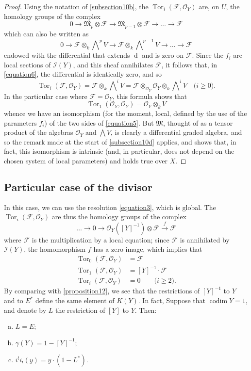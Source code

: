 \documentclass{article}
\theoremstyle{plain}
\newenvironment{proposition}[1]
    {\renewcommand\theinnercustomproposition{#1}\innercustomproposition}
    {\endinnercustomproposition}
\theoremstyle{definition}
\newcommand{\sh}{\mathscr}
\newcommand{\dd}{\operatorname{d}\!}
\renewcommand{\geq}{\geqslant}
\DeclareMathOperator{\Tor}{Tor}
\DeclareMathOperator{\codim}{codim}
\begin{document}
\begin{proof}
  Using the notation of \cref{subsection10b}, the $\Tor_i(\sh{F},\sh{O}_Y)$ are, on $U$, the homology groups of the complex
  \[
    0\to\mathfrak{M}_p\otimes\sh{F}\to\mathfrak{M}_{p-1}\otimes\sh{F}\to\ldots\to\sh{F}
  \]
  which can also be written as
  \[
  \label{equation6}
    0 \to \sh{F}\otimes_k\bigwedge\nolimits^p V \to \sh{F}\otimes_k\bigwedge\nolimits^{p-1}V \to \ldots \to \sh{F}
    \tag{6}
  \]
  endowed with the differential that extends $\dd$ and is zero on $\sh{F}$.
  Since the $f_i$ are local sections of $\sh{I}(Y)$, and this sheaf annihilates $\sh{F}$, it follows that, in \cref{equation6}, the differential is identically zero, and so
  \[
    \Tor_i(\sh{F},\sh{O}_Y) = \sh{F}\otimes_k\bigwedge\nolimits^iV = \sh{F}\otimes_{\sh{O}_Y}\sh{O}_Y\otimes_k\bigwedge\nolimits^i V
    \quad\mbox{($i\geq0$).}
  \]
  In the particular case where $\sh{F}=\sh{O}_Y$, this formula shows that
  \[
    \Tor_1(\sh{O}_Y,\sh{O}_Y) = \sh{O}_Y\otimes_k V
  \]
  whence we have an isomorphism (for the moment, local, defined by the use of the parameters $f_i$) of the two sides of \cref{equation5}.
  But $\mathfrak{M}$, thought of as a tensor product of the algebras $\sh{O}_Y$ and $\bigwedge V$, is clearly a differential graded algebra, and so the remark made at the start of \cref{subsection10d} applies, and shows that, in fact, this isomorphism is intrinsic (and, in particular, does not depend on the chosen system of local parameters) and holds true over $X$.
\end{proof}


\subsection{Particular case of the divisor}
\label{subsection10e}

In this case, we can use the resolution \cref{equation3}, which is global.
The $\Tor_i(\sh{F},\sh{O}_Y)$ are thus the homology groups of the complex
\[
  \ldots \to 0 \to \sh{O}_Y([Y]^{-1})\otimes\sh{F} \xrightarrow{f}\sh{F}
\]
where $\sh{F}$ is the multiplication by a local equation;
since $\sh{F}$ is annihilated by $\sh{I}(Y)$, the homomorphism $f$ has a zero image, which implies that
\begin{align*}
  \Tor_0(\sh{F},\sh{O}_Y) &= \sh{F}
\\\Tor_1(\sh{F},\sh{O}_Y) &= [Y]^{-1}\cdot\sh{F}
\\\Tor_i(\sh{F},\sh{O}_Y) &= 0 \qquad\mbox{($i\geq2$).}
\end{align*}
By comparing with \cref{proposition12}, we see that the restrictions of $[Y]^{-1}$ to $Y$ and to $E^*$ define the same element of $K(Y)$.
In fact,
\begin{proposition}{13}
\label{proposition13}
  Suppose that $\codim Y=1$, and denote by $L$ the restriction of $[Y]$ to $Y$.
  Then:
  \begin{enumerate}[(a)]
    \item $L=E$;
    \item $\gamma(Y) = 1-[Y]^{-1}$;
    \item $i^!i_!(y) = y\cdot(1-L^*).$
  \end{enumerate}
\end{proposition}
\end{document}
